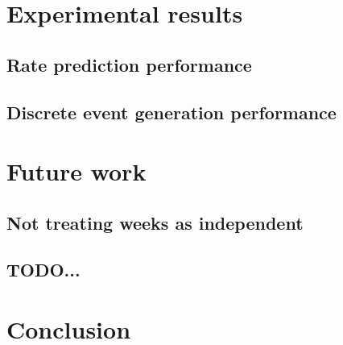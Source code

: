 \documentclass[10pt,conference,compsocconf]{IEEEtran}
\begin{document}

\section{Experimental results}

\subsection{Rate prediction performance}

\subsection{Discrete event generation performance}



\section{Future work}

\subsection{Not treating weeks as independent}

\subsection{TODO...}

\section{Conclusion}



\end{document}
